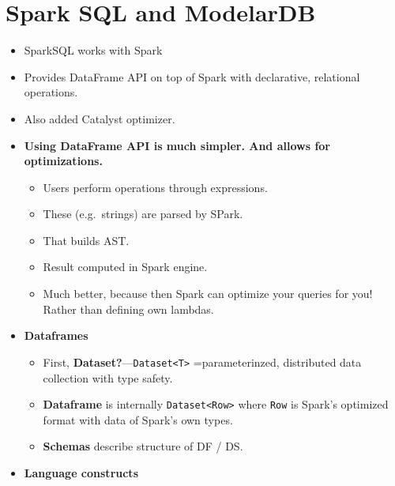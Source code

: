  

\section{Spark SQL and ModelarDB}
\begin{multicols}{2}
\begin{itemize}
\item
  SparkSQL works with Spark
\item
  Provides DataFrame API on top of Spark with declarative, relational
  operations.
\item
  Also added Catalyst optimizer.
\item
  \textbf{Using DataFrame API is much simpler. And allows for
  optimizations.}

  \begin{itemize}
    \item
    Users perform operations through expressions.
  \item
    These (e.g.~strings) are parsed by SPark.
  \item
    That builds AST.
  \item
    Result computed in Spark engine.
  \item
    Much better, because then Spark can optimize your queries for you!
    Rather than defining own lambdas.
  \end{itemize}
\item
  \textbf{Dataframes}

  \begin{itemize}
    \item
    First,
    \textbf{Dataset?}---\texttt{Dataset\textless{}T\textgreater{}}
    =parameterinzed, distributed data collection with type safety.
  \item
    \textbf{Dataframe} is internally
    \texttt{Dataset\textless{}Row\textgreater{}} where \texttt{Row} is
    Spark's optimized format with data of Spark's own types.
  \item
    \textbf{Schemas} describe structure of DF / DS.
  \end{itemize}
\item
  \textbf{Language constructs}


\end{itemize}
\end{multicols}
